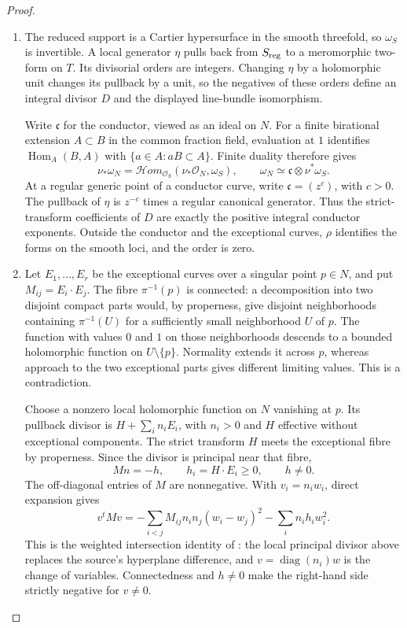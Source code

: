 \begin{proof}
\begin{enumerate}[label=\arabic*.,leftmargin=*]
\item The reduced support is a Cartier hypersurface in the smooth
threefold, so $\omega_S$ is invertible. A local generator $\eta$
pulls back from $S_{\rm reg}$ to a meromorphic two-form on $T$.
Its divisorial orders are integers. Changing $\eta$ by a holomorphic
unit changes its pullback by a unit, so the negatives of these
orders define an integral divisor $D$ and the displayed
line-bundle isomorphism.

Write $\mathfrak c$ for the conductor, viewed as an ideal on $N$.
For a finite birational extension $A\subset B$ in the common
fraction field, evaluation at $1$ identifies
$\operatorname{Hom}_A(B,A)$ with
$\{a\in A:aB\subset A\}$. Finite duality therefore gives
\[
 \nu_*\omega_N
   =\mathcal Hom_{\mathcal O_S}(\nu_*\mathcal O_N,\omega_S),
 \qquad
 \omega_N\simeq\mathfrak c\otimes\nu^*\omega_S.
\]
At a regular generic point of a conductor curve, write
$\mathfrak c=(z^c)$, with $c>0$. The pullback of $\eta$ is
$z^{-c}$ times a regular canonical generator. Thus the
strict-transform coefficients of $D$ are exactly the positive
integral conductor exponents. Outside the conductor and the
exceptional curves, $\rho$ identifies the forms on the smooth
loci, and the order is zero.

\item Let $E_1,\ldots,E_r$ be the exceptional curves over a singular
point $p\in N$, and put $M_{ij}=E_i\cdot E_j$.
The fibre $\pi^{-1}(p)$ is connected: a decomposition into two
disjoint compact parts would, by properness, give disjoint
neighborhoods containing $\pi^{-1}(U)$ for a sufficiently small
neighborhood $U$ of $p$. The function with values $0$ and $1$
on those neighborhoods descends to a bounded holomorphic function
on $U\setminus\{p\}$. Normality extends it across $p$, whereas
approach to the two exceptional parts gives different limiting
values. This is a contradiction.

Choose a nonzero local holomorphic function on $N$ vanishing at
$p$. Its pullback divisor is $H+\sum_i n_iE_i$, with $n_i>0$
and $H$ effective without exceptional components. The strict
transform $H$ meets the exceptional fibre by properness. Since
the divisor is principal near that fibre,
\[
 Mn=-h,\qquad h_i=H\cdot E_i\ge0,\qquad h\ne0.
\]
The off-diagonal entries of $M$ are nonnegative. With
$v_i=n_iw_i$, direct expansion gives
\[
 v^tMv
 =-\sum_{i<j}M_{ij}n_in_j(w_i-w_j)^2
   -\sum_i n_ih_iw_i^2.
\]
This is the weighted intersection identity of
\cite[p.~6]{Mumford1961}: the local principal divisor above
replaces the source's hyperplane difference, and
$v=\operatorname{diag}(n_i)w$ is the change of variables.
Connectedness and $h\ne0$ make the right-hand side strictly
negative for $v\ne0$.


\end{enumerate}
\end{proof}

